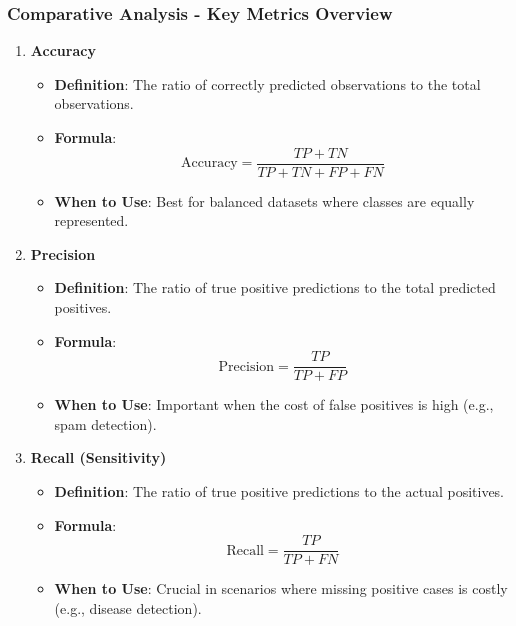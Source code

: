 \documentclass[aspectratio=169]{beamer}
\begin{document}
\begin{frame}[fragile]
    \frametitle{Comparative Analysis - Key Metrics Overview}
    \begin{enumerate}
        \item \textbf{Accuracy}
            \begin{itemize}
                \item \textbf{Definition}: The ratio of correctly predicted observations to the total observations.
                \item \textbf{Formula}:
                \[
                \text{Accuracy} = \frac{TP + TN}{TP + TN + FP + FN}
                \]
                \item \textbf{When to Use}: Best for balanced datasets where classes are equally represented.
            \end{itemize}
        
        \item \textbf{Precision}
            \begin{itemize}
                \item \textbf{Definition}: The ratio of true positive predictions to the total predicted positives.
                \item \textbf{Formula}:
                \[
                \text{Precision} = \frac{TP}{TP + FP}
                \]
                \item \textbf{When to Use}: Important when the cost of false positives is high (e.g., spam detection).
            \end{itemize}

        \item \textbf{Recall (Sensitivity)}
            \begin{itemize}
                \item \textbf{Definition}: The ratio of true positive predictions to the actual positives.
                \item \textbf{Formula}:
                \[
                \text{Recall} = \frac{TP}{TP + FN}
                \]
                \item \textbf{When to Use}: Crucial in scenarios where missing positive cases is costly (e.g., disease detection).
            \end{itemize}
    \end{enumerate}
\end{frame}
\end{document}
